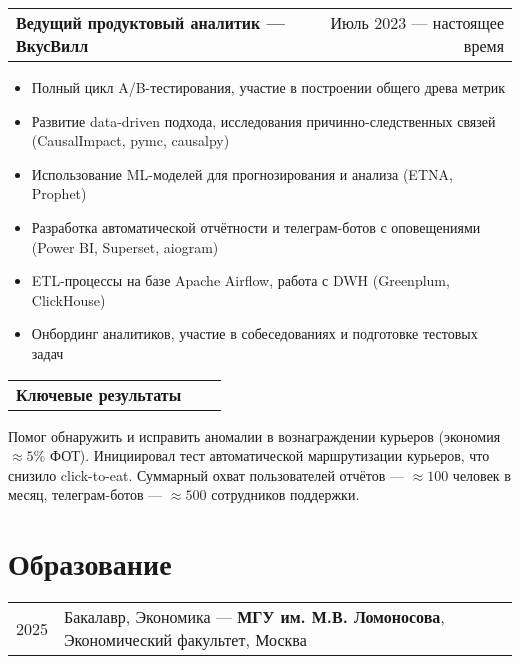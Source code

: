 \documentclass[a4paper,12pt]{article}
\makeatletter
\newenvironment{jobshort}[2]
    {
    \begin{tabularx}{\linewidth}{@{}l X r@{}}
    \textbf{#1} & \hfill &  #2 \\[3.75pt]
    \end{tabularx}
    }
    {
    }
\newenvironment{joblong}[2]
    {
    \begin{tabularx}{\linewidth}{@{}l X r@{}}
    \textbf{#1} & \hfill &  #2 \\[3.75pt]
    \end{tabularx}
    \begin{minipage}[t]{\linewidth}
    \begin{itemize}[nosep,after=\strut, leftmargin=1em, itemsep=3pt,label=--]
    }
    {
    \end{itemize}
    \end{minipage}    
    }
\makeatother
\begin{document}
\begin{joblong}{Ведущий продуктовый аналитик — ВкусВилл}{Июль 2023 — настоящее время}
\item Полный цикл A/B-тестирования, участие в построении общего древа метрик
\item Развитие data-driven подхода, исследования причинно-следственных связей (CausalImpact, pymc, causalpy)
\item Использование ML-моделей для прогнозирования и анализа (ETNA, Prophet)
\item Разработка автоматической отчётности и телеграм-ботов с оповещениями (Power BI, Superset, aiogram)
\item ETL-процессы на базе Apache Airflow, работа с DWH (Greenplum, ClickHouse)
\item Онбординг аналитиков, участие в собеседованиях и подготовке тестовых задач
\end{joblong}

\begin{jobshort}{Ключевые результаты}{ } 
Помог обнаружить и исправить аномалии в вознаграждении курьеров (экономия $\approx 5\%$ ФОТ). 
Инициировал тест автоматической маршрутизации курьеров, что снизило click-to-eat. 
\newline Суммарный охват пользователей отчётов — $\approx 100$ человек в месяц, телеграм-ботов — $\approx 500$ сотрудников поддержки.
\end{jobshort}
  
%

\section{Образование}
\begin{tabularx}{\linewidth}{@{}l X@{}}	
2025 & Бакалавр, Экономика — \textbf{МГУ им. М.В. Ломоносова}, Экономический факультет, Москва \\
\end{tabularx}
\end{document}
